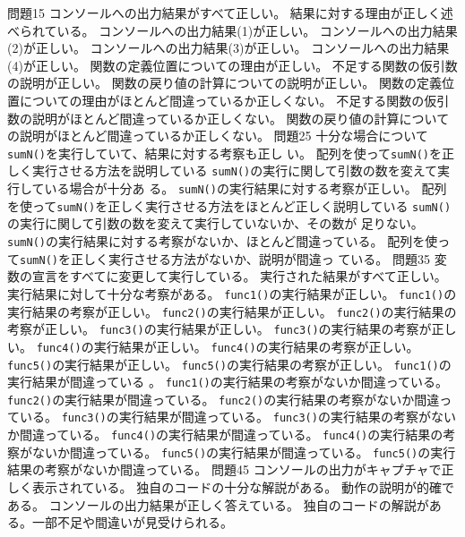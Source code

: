 {{問題1}{5}{
  {コンソールへの出力結果がすべて正しい。}
	{結果に対する理由が正しく述べられている。}
	}
	{
  {コンソールへの出力結果(1)が正しい。}
  {コンソールへの出力結果(2)が正しい。}
  {コンソールへの出力結果(3)が正しい。}
  {コンソールへの出力結果(4)が正しい。}
	{関数の定義位置についての理由が正しい。}
	{不足する関数の仮引数の説明が正しい。}
	{関数の戻り値の計算についての説明が正しい。}
	}
	{
	{関数の定義位置についての理由がほとんど間違っているか正しくない。}
	{不足する関数の仮引数の説明がほとんど間違っているか正しくない。}
	{関数の戻り値の計算についての説明がほとんど間違っているか正しくない。}
	}
{問題2}{5}{
  {十分な場合について\texttt{sumN()}を実行していて、結果に対する考察も正し
	い。}
	{配列を使って\texttt{sumN()}を正しく実行させる方法を説明している}
	}
	{
  {\texttt{sumN()}の実行に関して引数の数を変えて実行している場合が十分あ
	る。}
  {\texttt{sumN()}の実行結果に対する考察が正しい。}
	{配列を使って\texttt{sumN()}を正しく実行させる方法をほとんど正しく説明している}
	}
	{
  {\texttt{sumN()}の実行に関して引数の数を変えて実行していないか、その数が
	足りない。}
  {\texttt{sumN()}の実行結果に対する考察がないか、ほとんど間違っている。}
	{配列を使って\texttt{sumN()}を正しく実行させる方法がないか、説明が間違っ
  ている。}
	}
{問題3}{5}{
  {変数の宣言をすべてに変更して実行している。}
  {実行された結果がすべて正しい。}
  {実行結果に対して十分な考察がある。}
	}
	{
	{\texttt{func1()}の実行結果が正しい。}
	{\texttt{func1()}の実行結果の考察が正しい。}
	{\texttt{func2()}の実行結果が正しい。}
	{\texttt{func2()}の実行結果の考察が正しい。}
	{\texttt{func3()}の実行結果が正しい。}
	{\texttt{func3()}の実行結果の考察が正しい。}
	{\texttt{func4()}の実行結果が正しい。}
	{\texttt{func4()}の実行結果の考察が正しい。}
	{\texttt{func5()}の実行結果が正しい。}
	{\texttt{func5()}の実行結果の考察が正しい。}
	}
	{
	{\texttt{func1()}の実行結果が間違っている%
  。}
	{\texttt{func1()}の実行結果の考察がないか間違っている。}
	{\texttt{func2()}の実行結果が間違っている。}
	{\texttt{func2()}の実行結果の考察がないか間違っている。}
	{\texttt{func3()}の実行結果が間違っている。}
	{\texttt{func3()}の実行結果の考察がないか間違っている。}
	{\texttt{func4()}の実行結果が間違っている。}
	{\texttt{func4()}の実行結果の考察がないか間違っている。}
	{\texttt{func5()}の実行結果が間違っている。}
	{\texttt{func5()}の実行結果の考察がないか間違っている。}
	}
{問題4}{5}{
  {コンソールの出力がキャプチャで正しく表示されている。}
	{独自のコードの十分な解説がある。}
	{動作の説明が的確である。}
	}
	{
  {コンソールの出力結果が正しく答えている。}
	{独自のコードの解説がある。一部不足や間違いが見受けられる。}
}}
